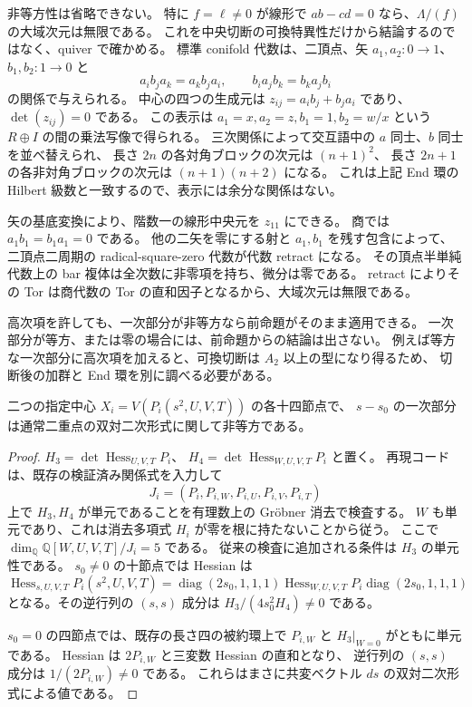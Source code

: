 \begin{remark}[一次項が等方な場合]
\label{cmo:rem:conifold-isotropic-slice}
非等方性は省略できない。
特に $f=\ell\ne0$ が線形で $ab-cd=0$ なら、$\Lambda/(f)$ の大域次元は無限である。
これを中央切断の可換特異性だけから結論するのではなく、quiver で確かめる。
標準 conifold 代数は、二頂点、矢
$a_1,a_2:0\to1$、$b_1,b_2:1\to0$ と
\[
 a_i b_j a_k=a_k b_j a_i,\qquad
 b_i a_j b_k=b_k a_j b_i
\]
の関係で与えられる。
中心の四つの生成元は $z_{ij}=a_i b_j+b_j a_i$ であり、
$\det(z_{ij})=0$ である。
この表示は $a_1=x,a_2=z,b_1=1,b_2=w/x$ という
$R\oplus I$ の間の乗法写像で得られる。
三次関係によって交互語中の $a$ 同士、$b$ 同士を並べ替えられ、
長さ $2n$ の各対角ブロックの次元は $(n+1)^2$、
長さ $2n+1$ の各非対角ブロックの次元は $(n+1)(n+2)$ になる。
これは上記 End 環の Hilbert 級数と一致するので、表示には余分な関係はない。

矢の基底変換により、階数一の線形中央元を $z_{11}$ にできる。
商では $a_1b_1=b_1a_1=0$ である。
他の二矢を零にする射と $a_1,b_1$ を残す包含によって、
二頂点二周期の radical-square-zero 代数が代数 retract になる。
その頂点半単純代数上の bar 複体は全次数に非零項を持ち、微分は零である。
retract によりその Tor は商代数の Tor の直和因子となるから、大域次元は無限である。

高次項を許しても、一次部分が非等方なら前命題がそのまま適用できる。
一次部分が等方、または零の場合には、前命題からの結論は出さない。
例えば等方な一次部分に高次項を加えると、可換切断は $A_2$ 以上の型になり得るため、
切断後の加群と End 環を別に調べる必要がある。
\end{remark}

\begin{lemma}[指定中心の全節点における非等方性]
\label{cmo:lem:all-nodes-nonisotropic}
二つの指定中心 $X_i=V(P_i(s^2,U,V,T))$ の各十四節点で、
$s-s_0$ の一次部分は通常二重点の双対二次形式に関して非等方である。
\end{lemma}
\begin{proof}
$H_3=\det\operatorname{Hess}_{U,V,T}P_i$、
$H_4=\det\operatorname{Hess}_{W,U,V,T}P_i$ と置く。
再現コード  は、既存の検証済み関係式を入力して
\[
 J_i=(P_i,P_{i,W},P_{i,U},P_{i,V},P_{i,T})
\]
上で $H_3,H_4$ が単元であることを有理数上の Gr\"obner 消去で検査する。
$W$ も単元であり、これは消去多項式 $H_i$ が零を根に持たないことから従う。
ここで $\dim_\mathbb Q\mathbb Q[W,U,V,T]/J_i=5$ である。
従来の検査に追加される条件は $H_3$ の単元性である。
$s_0\ne0$ の十節点では Hessian は
\[
 \operatorname{Hess}_{s,U,V,T}P_i(s^2,U,V,T)
 =\operatorname{diag}(2s_0,1,1,1)
   \operatorname{Hess}_{W,U,V,T}P_i
   \operatorname{diag}(2s_0,1,1,1)
\]
となる。その逆行列の $(s,s)$ 成分は
$H_3/(4s_0^2H_4)\ne0$ である。

$s_0=0$ の四節点では、既存の長さ四の被約環上で
$P_{i,W}$ と $H_3|_{W=0}$ がともに単元である。
Hessian は $2P_{i,W}$ と三変数 Hessian の直和となり、
逆行列の $(s,s)$ 成分は $1/(2P_{i,W})\ne0$ である。
これらはまさに共変ベクトル $ds$ の双対二次形式による値である。
\end{proof}


